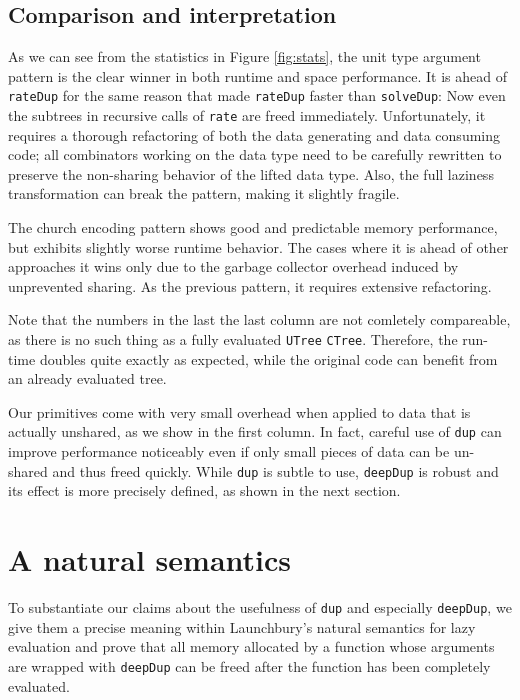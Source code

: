 \documentclass[preprint]{sigplanconf}
\theoremstyle{nonumberplain}
\newcommand{\li}{\lstinline[style=Haskell]}
\begin{document}
\subsection{Comparison and interpretation}

As we can see from the statistics in Figure \ref{fig:stats}, the unit type argument pattern is the clear winner in both runtime and space performance. It is ahead of \li-rateDup- for the same reason that made \li-rateDup- faster than \li-solveDup-: Now even the subtrees in recursive calls of \li-rate- are freed immediately.
Unfortunately, it requires a thorough refactoring of both the data generating and data consuming code; all combinators working on the data type need to be carefully rewritten to preserve the non-sharing behavior of the lifted data type. Also, the full laziness transformation can break the pattern, making it slightly fragile.

The church encoding pattern shows good and predictable memory performance, but exhibits slightly worse runtime behavior. The cases where it is ahead of other approaches it wins only due to the garbage collector overhead induced by unprevented sharing. As the previous pattern, it requires extensive refactoring.

Note that the numbers in the last the last column are not comletely compareable, as there is no such thing as a fully evaluated \li-UTree- \li-CTree-. Therefore, the run-time doubles quite exactly as expected, while the original code can benefit from an already evaluated tree.

Our primitives come with very small overhead when applied to data that is actually unshared, as we show in the first column. In fact, careful use of \li-dup- can improve performance noticeably even if only small pieces of data can be un-shared and thus freed quickly. While \li-dup- is subtle to use, \li-deepDup- is robust and its effect is more precisely defined, as shown in the next section.

\section{A natural semantics}
\label{sec:semantics}

To substantiate our claims about the usefulness of \li-dup- and especially \li-deepDup-, we give them a precise meaning within Launchbury’s natural semantics for lazy evaluation \citep{launchbury} and prove that all memory allocated by a function whose arguments are wrapped with \li-deepDup- can be freed after the function has been completely evaluated.
\end{document}
